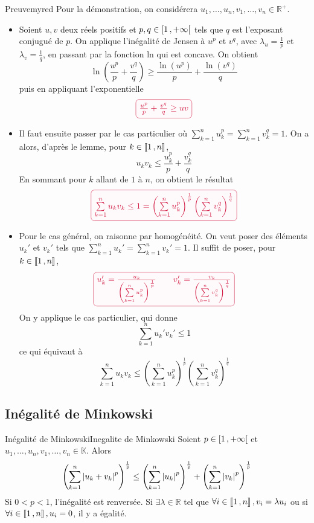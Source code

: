     \begin{demo}{Preuve}{myred}
        Pour la démonstration, on considérera $u_1,\ldots,u_n,v_1,\ldots,v_n \in \mathbb{R}^+$.
    \begin{itemize}
    \item Soient $u,v$ deux réels positifs et $p,q \in \left[ 1 \, , + \infty \right[$ tels que $q$ est l’exposant conjugué de $p$. On applique l’inégalité de Jensen à $u^p$ et $v^q$, avec $\lambda_u = \frac{1}{p}$ et $\lambda_v = \frac{1}{q}$, en passant par la fonction ln qui est concave. On obtient 
    \[ \ln \left(\frac{u^p}{p} + \frac{v^q}{q}\right) \geq \frac{\ln(u^p)}{p} + \frac{\ln(v^q)}{q} \]
    puis en appliquant l’exponentielle 
    \[ \lilbox{myred}{$\frac{u^p}{p} + \frac{v^q}{q} \geq uv$} \]
    \item Il faut ensuite passer par le cas particulier où $\sum\limits_{k=1}^n u_k^p = \sum\limits_{k=1}^n v_k^q = 1$. On a alors, d’après le lemme, pour $k \in \left\llbracket 1 \, , n \right\rrbracket$, \[ u_k v_k \leq \frac{u_k^p}{p} + \frac{v_k^q}{q} \] 
    En sommant pour $k$ allant de $1$ à $n$, on obtient le résultat
    \[ \lilbox{myred}{$ \sum\limits_{k=1}^n u_k v_k \leq 1 = \left(\sum\limits_{k=1}^n u_k^p\right)^{\frac{1}{p}} \left(\sum\limits_{k=1}^n  v_k^q\right)^{\frac{1}{q}} $} \] 
    \item Pour le cas général, on raisonne par homogénéité. On veut poser des éléments $u_k'$ et $v_k'$ tels que $\sum\limits_{k=1}^n u_k' = \sum\limits_{k=1}^n v_k' = 1$. Il suffit de poser, pour $k \in \left\llbracket 1 \, , n \right\rrbracket$, \[ \lilbox{myred}{$u_k' = \frac{u_k}{\left( \sum\limits_{k=1}^n u_k^p\right)^{\frac{1}{p}}}  \qquad v_k' = \frac{v_k}{\left(\sum\limits_{k=1}^n  v_k^q\right)^{\frac{1}{q}}}$} \] 
    On y applique le cas particulier, qui donne 
    \[ \sum\limits_{k=1}^n u_k' v_k' \leq 1 \] 
    ce qui équivaut à 
    \[ \sum\limits_{k=1}^n u_k v_k \leq \left(\sum\limits_{k=1}^n u_k^p\right)^{\frac{1}{p}} \left(\sum\limits_{k=1}^n  v_k^q\right)^{\frac{1}{q}} \]
    \end{itemize}
    \end{demo}

    \subsection{Inégalité de Minkowski}

    \begin{theo}{Inégalité de Minkowski}{Inegalite de Minkowski}
        Soient $p \in \left[ 1 \, , + \infty \right[$ et $u_1,\ldots,u_n,v_1,\ldots,v_n \in \mathbb{K}$.
        \tcblower
        Alors 
        \[ \left(\sum\limits_{k=1}^n \left\lvert u_k+v_k\right\rvert^p\right)^{\frac{1}{p}}\leq \left(\sum\limits_{k=1}^n \left\lvert u_k\right\rvert^p\right)^{\frac{1}{p}}+\left(\sum\limits_{k=1}^n \left\lvert v_k\right\rvert^p\right)^{\frac{1}{p}} \]
        Si $ 0 < p < 1$, l’inégalité est renversée. \newline
        Si $\exists \lambda \in \mathbb{R}$ tel que $\forall i \in \left\llbracket 1 \, , n \right\rrbracket, v_i = \lambda u_i$ ou si $\forall i \in \left\llbracket 1 \, , n \right\rrbracket, u_i = 0$, il y a égalité.
    \end{theo}

